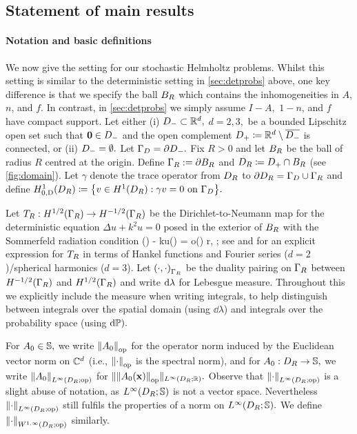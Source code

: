 \subsection{Statement of main results}\label{sec:hh-results}

\paragraph{Notation and basic definitions} We now give the setting for our stochastic Helmholtz problems. Whilst this setting is similar to the deterministic setting in \cref{sec:detprobs} above, one key difference is that we specify the ball $B_{R}$ which contains the inhomogeneities in $A$, $n$, and $f$. In contrast, in \cref{sec:detprobs} we simply assume $I-A,$ $1-n$, and $f$ have compact support. Let either (i) $D_{-} \subset \mathbb R^{d},$ $d=2,3,$ be a bounded Lipschitz open set such that $\mathbf{0} \in D_{-}$ and the open complement $D_{+}\coloneqq \mathbb R^d\setminus \overline{D_{-}}$ is connected, or (ii) $D_{-} = \emptyset.$ Let $\Gamma_{D} = \partial D_{-}.$ 
Fix $R>0$ and let $B_{R}$ be the ball of radius $R$ centred at the origin. Define $\Gamma_{R} := \partial B_{R}$ and $D_{R} \coloneqq D_{+} \cap B_{R}$ (see \cref{fig:domain}). Let $\gamma$ denote the trace operator from $D_{R}$ to $\partial D_{R} = \Gamma_{D} \cup \Gamma_{R}$ and define $\HozDDR \de \set{v \in \HoDR \st \gamma v = 0 \ton \GD}.$ 
 
Let $T_{R}: H^{1/2}(\Gamma_R) \rightarrow H^{-1/2}(\Gamma_R)$ be the Dirichlet-to-Neumann map for the deterministic equation $\Delta u+k^2 u=0$ posed in the exterior of $B_{R}$ with the Sommerfeld radiation condition 
\beq\label{eq:src}
(\bx) - \ri ku(\bx) = o\mleft(\mright)  r\de\abs{\bx}\rightarrow \infty,  \frac{\bx}{\abs{\bx}};
\eeq
see \cite[Section 2.6.3]{Ne:01} and \cite[Equations 3.5 and 3.6]{ChMo:08} for an explicit expression for $T_{R}$  in terms of Hankel functions and Fourier series ($d=2$)/spherical harmonics ($d=3$). Let $\IPGR{\cdot}{\cdot}$ be the duality pairing on $\Gamma_{R}$ between $\HmhGR$ and $\HhGR$ and write $\mathrm{d}\lambda$ for Lebesgue measure. Throughout this  we explicitly include the measure when writing integrals, to help distinguish between integrals over the spatial domain (using $\dd\lambda$) and integrals over the probability space (using $\mathrm{d}\mathbb P).$

For $A_{0} \in \mathbb S,$ we write $\NopCCd{\Az}$ for the operator norm induced by the Euclidean vector norm on $\mathbb C^{d}$ (i.e., $\NopCCd{\cdot}$ is the spectral norm), and for $A_{0}:D_{R} \rightarrow \mathbb S,$ we write $\NLiDRRRdtd{\Az}$ for $\NLiDRRRsmall{\Nop{\Az(\bx)}}.$ Observe that $\NLiDRRRdtd{\cdot}$ is a slight abuse of notation, as $\LiDRRRdtd$ is not a vector space. Nevertheless $\NLiDRRRdtd{\cdot}$ still fulfils the properties of a norm on $\LiDRRRdtd.$ We define $\NWoiDRRRdtd{\cdot}$ similarly.

